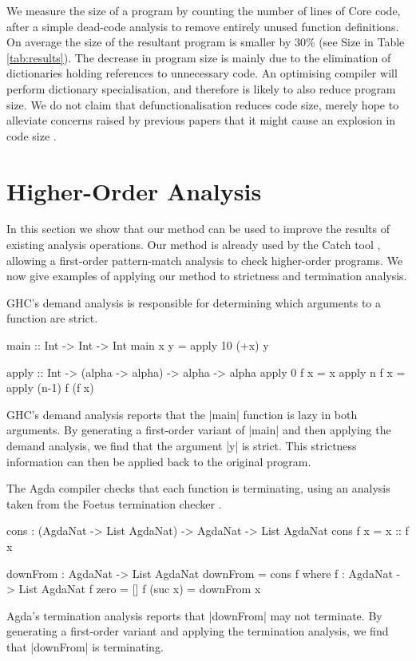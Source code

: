 \documentclass[preprint]{sigplanconf}
\begin{document}
We measure the size of a program by counting the number of lines of Core code, after a simple dead-code analysis to remove entirely unused function definitions. On average the size of the resultant program is smaller by 30\% (see Size in Table \ref{tab:results}). The decrease in program size is mainly due to the elimination of dictionaries holding references to unnecessary code. An optimising compiler will perform dictionary specialisation, and therefore is likely to also reduce program size. We do not claim that defunctionalisation reduces code size, merely hope to alleviate concerns raised by previous papers that it might cause an explosion in code size \cite{chin:higher_order_removal}.

\section{Higher-Order Analysis}
\label{sec:strictness}

In this section we show that our method can be used to improve the results of existing analysis operations. Our method is already used by the Catch tool \cite{me:catch}, allowing a first-order pattern-match analysis to check higher-order programs. We now give examples of applying our method to strictness and termination analysis.

\begin{example}
GHC's demand analysis \cite{ghc} is responsible for determining which arguments to a function are strict.

\begin{code}
main :: Int -> Int -> Int
main x y = apply 10 (+x) y

apply :: Int -> (alpha -> alpha) -> alpha -> alpha
apply 0 f x = x
apply n f x = apply (n-1) f (f x)
\end{code}

GHC's demand analysis reports that the |main| function is lazy in both arguments. By generating a first-order variant of |main| and then applying the demand analysis, we find that the argument |y| is strict. This strictness information can then be applied back to the original program.
\end{example}

\begin{example}
The Agda compiler \cite{agda} checks that each function is terminating, using an analysis taken from the Foetus termination checker \cite{abel:foetus}.

\ignore\begin{code}
cons : (AgdaNat -> List AgdaNat) -> AgdaNat -> List AgdaNat
cons f x = x :: f x

downFrom : AgdaNat -> List AgdaNat
downFrom = cons f
    where  f : AgdaNat -> List AgdaNat
           f zero     = []
           f (suc x)  = downFrom x
\end{code}

Agda's termination analysis reports that |downFrom| may not terminate. By generating a first-order variant and applying the termination analysis, we find that |downFrom| is terminating.
\end{example}
\smallskip
\end{document}
